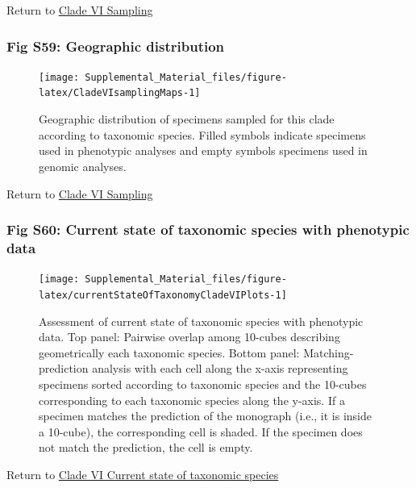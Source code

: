 \documentclass[
  11pt,
]{article}
\begin{document}
Return to \protect\hyperlink{sampling-6}{Clade VI Sampling}
\pagebreak

\hypertarget{fig-s59-geographic-distribution}{%
\subsubsection{Fig S59: Geographic distribution}\label{fig-s59-geographic-distribution}}

\begin{figure}

{\centering \texttt{[image: Supplemental\_Material\_files/figure-latex/CladeVIsamplingMaps-1]} 

}

\caption{Geographic distribution of specimens sampled for this clade according to taxonomic species. Filled symbols indicate specimens used in phenotypic analyses and empty symbols specimens used in genomic analyses.}\label{fig:CladeVIsamplingMaps}
\end{figure}

Return to \protect\hyperlink{sampling-6}{Clade VI Sampling}
\pagebreak

\hypertarget{fig-s60-current-state-of-taxonomic-species-with-phenotypic-data}{%
\subsubsection{Fig S60: Current state of taxonomic species with phenotypic data}\label{fig-s60-current-state-of-taxonomic-species-with-phenotypic-data}}

\begin{figure}
\texttt{[image: Supplemental\_Material\_files/figure-latex/currentStateOfTaxonomyCladeVIPlots-1]} \caption{Assessment of current state of taxonomic species with phenotypic data. Top panel: Pairwise overlap among 10-cubes describing geometrically each taxonomic species. Bottom panel: Matching-prediction analysis with each cell along the x-axis representing specimens sorted according to taxonomic species and the 10-cubes corresponding to each taxonomic species along the y-axis. If a specimen matches the prediction of the monograph (i.e., it is inside a 10-cube), the corresponding cell is shaded. If the specimen does not match the prediction, the cell is empty.}\label{fig:currentStateOfTaxonomyCladeVIPlots}
\end{figure}

Return to \protect\hyperlink{current-state-of-taxonomic-species-5}{Clade VI Current state of taxonomic species}
\pagebreak
\end{document}
